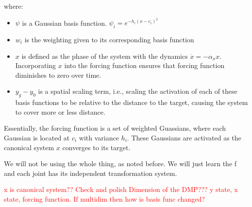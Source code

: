 \documentclass[10pt]{article}
\begin{document}
where:
\begin{itemize}
	\item $\psi$ is a Gaussian basis function. $\psi_i = e^{-h_i (x - c_i)^2}$
	\item $w_i$ is the weighting given to its corresponding basis function
    \item $x$ is defined as the phase of the system with the dynamics $\dot{x} = - \alpha_x x$. Incorporating $x$ into the forcing function ensures that forcing function diminishes to zero over time. 
	\item $y_g - y_0$ is a spatial scaling term, i.e., scaling the activation of each of these basis functions to be relative to the distance to the target, causing the system to cover more or less distance.
\end{itemize}

Essentially, the forcing function is a set of weighted Guassians, where each Gaussian is located at $c_i$ with variance $h_i$. These Gaussians are activated as the canonical system $x$ converges to its target. 

We will not be using the whole thing, as noted before. We will just learn the f and each joint has its independent transformation system.

\textcolor{red}{x is canonical system?? Check and polish}
\textcolor{red}{Dimension of the DMP??? y state, x state, forcing function. If multidim then how is basis func changed?}
\end{document}
